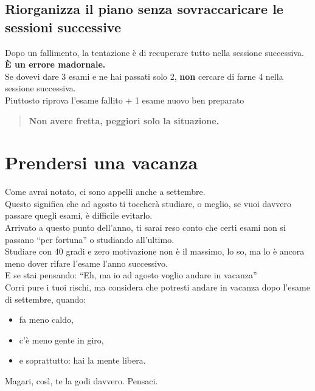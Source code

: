 \documentclass[18pt]{extarticle}
\begin{document}
\subsection{Riorganizza il piano senza sovraccaricare le sessioni successive}
Dopo un fallimento, la tentazione è di recuperare tutto nella sessione successiva.\\
\textbf{È un errore madornale.}\\
Se dovevi dare 3 esami e ne hai passati solo 2, \textbf{non} cercare di farne 4 nella sessione successiva.\\
Piuttosto riprova l'esame fallito + 1 esame nuovo ben preparato
\begin{quote}
\textbf{Non avere fretta, peggiori solo la situazione.}
\end{quote}


\section{Prendersi una vacanza}
Come avrai notato, ci sono appelli anche a settembre.\\
Questo significa che ad agosto ti toccherà studiare, o meglio, se vuoi davvero passare quegli esami, è difficile evitarlo.\\
Arrivato a questo punto dell'anno, ti sarai reso conto che certi esami non si passano ``per fortuna'' o studiando all'ultimo.\\
Studiare con 40 gradi e zero motivazione non è il massimo, lo so, ma lo è ancora meno dover rifare l'esame l'anno successivo.\\
E se stai pensando: ``Eh, ma io ad agosto voglio andare in vacanza''\\
Corri pure i tuoi rischi, ma considera che potresti andare in vacanza dopo l'esame di settembre, quando:
\begin{itemize}
\item fa meno caldo,
\item c'è meno gente in giro,
\item e soprattutto: hai la mente libera.
\end{itemize}
Magari, così, te la godi davvero. Pensaci.

\clearpage
\end{document}
